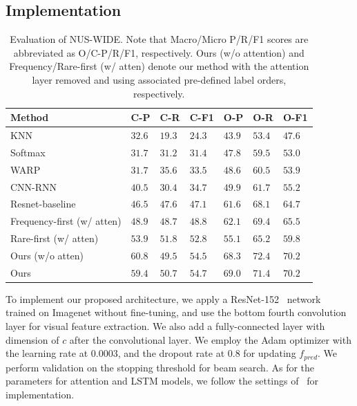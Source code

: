 \documentclass[letterpaper]{article} %
\begin{document}
\subsection{Implementation}
\tabcolsep=1.5pt
\begin{table}[]
\centering
\caption{Evaluation of NUS-WIDE. Note that Macro/Micro P/R/F1 scores are abbreviated as O/C-P/R/F1, respectively. Ours (w/o attention) and Frequency/Rare-first (w/ atten) denote our method with the attention layer removed and using associated pre-defined label orders, respectively.\\}

\begin{tabular}{l||lll|lll}
\hline
Method  & C-P  & C-R  & C-F1 & O-P  & O-R  & O-F1 \\ \hline
KNN		& $32.6$ & $19.3$ & $24.3$ & $43.9$ & $53.4$ & $47.6$ \\
Softmax & $31.7$ & $31.2$ & $31.4$ & $47.8$ & $59.5$ & $53.0$ \\
WARP    & $31.7$ & $35.6$ & $33.5$ & $48.6$ & $60.5$ & $53.9$ \\
CNN-RNN & $40.5$ & $30.4$ & $34.7$ & $49.9$ & $61.7$ & $55.2$ \\
Resnet-baseline   & $46.5$ & $47.6$ & $47.1$ & $61.6$ & $68.1$ & $64.7$ \\
Frequency-first (w/ atten)   & $48.9$ & $48.7$ & $48.8$ & $62.1$ & $69.4$ & $65.5$ \\
Rare-first (w/ atten)   & $53.9$ & $51.8$ & $52.8$ & $55.1$ & $65.2$ & $59.8$ \\
Ours (w/o atten)   & $60.8$ & $49.5$ & $54.5$ & $68.3$ & $72.4$ & $70.2$ \\
Ours    & $59.4$ & $50.7$ & $\mathbf{54.7}$ & $69.0$ & $71.4$ & $\mathbf{70.2}$ \\ \hline
\end{tabular}
\label{table:nuswide}
\end{table}

To implement our proposed architecture, we apply a ResNet-152~\cite{he2016deep} network trained on Imagenet without fine-tuning, and use the bottom fourth convolution layer for visual feature extraction. We also add a fully-connected layer with dimension of $c$ after the convolutional layer. We employ the Adam optimizer with the learning rate at 0.0003, and the dropout rate at 0.8 for updating $f_{pred}$. We perform validation on the stopping threshold for beam search. As for the parameters for attention and LSTM models, we follow the settings of~\cite{xu2015show} for implementation.
\end{document}
